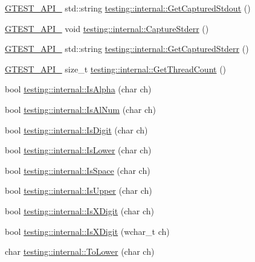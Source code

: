 \begin{DoxyCompactItemize}
\hyperlink{gtest-port_8h_aa73be6f0ba4a7456180a94904ce17790}{G\+T\+E\+S\+T\+\_\+\+A\+P\+I\+\_\+} std\+::string \hyperlink{namespacetesting_1_1internal_aed657219a9856a8d249a3230de0c54ce}{testing\+::internal\+::\+Get\+Captured\+Stdout} ()
\item 
\hyperlink{gtest-port_8h_aa73be6f0ba4a7456180a94904ce17790}{G\+T\+E\+S\+T\+\_\+\+A\+P\+I\+\_\+} void \hyperlink{namespacetesting_1_1internal_a8ec00d458d0d442bd64af7b5f9c22dda}{testing\+::internal\+::\+Capture\+Stderr} ()
\item 
\hyperlink{gtest-port_8h_aa73be6f0ba4a7456180a94904ce17790}{G\+T\+E\+S\+T\+\_\+\+A\+P\+I\+\_\+} std\+::string \hyperlink{namespacetesting_1_1internal_a374156401da17704099d0c33fa53adfb}{testing\+::internal\+::\+Get\+Captured\+Stderr} ()
\item 
\hyperlink{gtest-port_8h_aa73be6f0ba4a7456180a94904ce17790}{G\+T\+E\+S\+T\+\_\+\+A\+P\+I\+\_\+} size\+\_\+t \hyperlink{namespacetesting_1_1internal_a3b9b3649cd04558bf46c75de52a7ef34}{testing\+::internal\+::\+Get\+Thread\+Count} ()
\item 
bool \hyperlink{namespacetesting_1_1internal_aeb957087fd6bbf9db98ab7cd41b0c129}{testing\+::internal\+::\+Is\+Alpha} (char ch)
\item 
bool \hyperlink{namespacetesting_1_1internal_a83802e7f23324cd512232203662e1a98}{testing\+::internal\+::\+Is\+Al\+Num} (char ch)
\item 
bool \hyperlink{namespacetesting_1_1internal_a4bd96b7fa6486802d33ddc217af55a39}{testing\+::internal\+::\+Is\+Digit} (char ch)
\item 
bool \hyperlink{namespacetesting_1_1internal_ac26ce3883bc8919c27074975e958f3b7}{testing\+::internal\+::\+Is\+Lower} (char ch)
\item 
bool \hyperlink{namespacetesting_1_1internal_af429e04f70f9c10f6aa76a5d1ccd389f}{testing\+::internal\+::\+Is\+Space} (char ch)
\item 
bool \hyperlink{namespacetesting_1_1internal_a84f3baa379fec6bf5947cb5165aa8cc9}{testing\+::internal\+::\+Is\+Upper} (char ch)
\item 
bool \hyperlink{namespacetesting_1_1internal_aa234ef141278263fb143b616c74c86e7}{testing\+::internal\+::\+Is\+X\+Digit} (char ch)
\item 
bool \hyperlink{namespacetesting_1_1internal_a6ab68a30f8291c09b2289c132bbe3b16}{testing\+::internal\+::\+Is\+X\+Digit} (wchar\+\_\+t ch)
\item 
char \hyperlink{namespacetesting_1_1internal_ad9c627ef2a94245e3fd69e7ab3d49b42}{testing\+::internal\+::\+To\+Lower} (char ch)

\end{DoxyCompactItemize}
